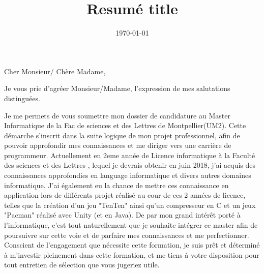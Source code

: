 \documentclass[11pt,a4paper,sans]{moderncv}
\title{Resumé title}
\begin{document}
\date{\today}

\opening{Cher Monsieur/ Chère Madame,}
\closing{Je vous prie d'agréer Monsieur/Madame, l'expression de mes salutations distinguées.}
\makelettertitle

Je me permets de vous soumettre mon dossier de candidature au Master Informatique de la Fac de sciences et des Lettres de Montpellier(UM2).
Cette démarche s’inscrit dans la suite logique de mon projet professionnel, afin de pouvoir approfondir mes connaissances et me diriger vers une carrière de programmeur.
Actuellement en 2eme année de Licence informatique à la Faculté des sciences et des Lettres , lequel je devrais obtenir en juin 2018, j’ai acquis des connaissances approfondies en language informatique et divers autres domaines informatique.
J'ai également eu la chance de mettre ces connaissance en application lors de différents projet réalisé au cour de ces 2 années de licence, telles que la création d'un jeu "TenTen" ainsi qu'un compresseur en C et un jeux "Pacman" réalisé avec Unity (et en Java).
De par mon grand intérêt porté à l'informatique, c’est tout naturellement que je souhaite intégrer ce master afin de poursuivre sur cette voie et de parfaire mes connaissances et me perfectionner.
Conscient de l’engagement que nécessite cette formation, je suis prêt et déterminé à m’investir pleinement dans cette formation, et me tiens à votre disposition pour tout  entretien de sélection que vous jugeriez utile.

\makeletterclosing
\end{document}
